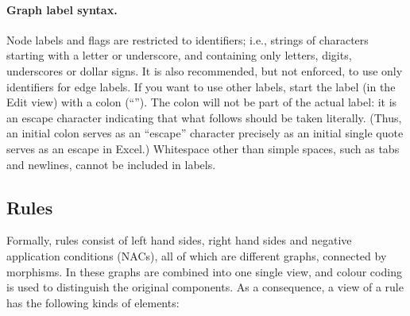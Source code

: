 \paragraph{Graph label syntax.}

Node labels and flags are restricted to identifiers; i.e., strings of
characters starting with a letter or underscore, and containing only letters,
digits, underscores or dollar signs. It is also recommended, but not enforced,
to use only identifiers for edge labels. If you want to use other labels, start
the label (in the Edit view) with a colon (``\lab{:}''). The colon will not be
part of the actual label: it is an escape character indicating that what
follows should be taken literally. (Thus, an initial colon serves as an
``escape'' character precisely as an initial single quote serves as an escape
in Excel.) Whitespace other than simple spaces, such as tabs and newlines,
cannot be included in labels.

\subsection{Rules}

Formally, rules consist of left hand sides, right hand sides and negative
application conditions (NACs), all of which are different graphs, connected by
morphisms. In \GROOVE{} these graphs are combined into one single view, and
colour coding is used to distinguish the original components. As a consequence,
a \GROOVE{} view of a rule has the following kinds of elements:

